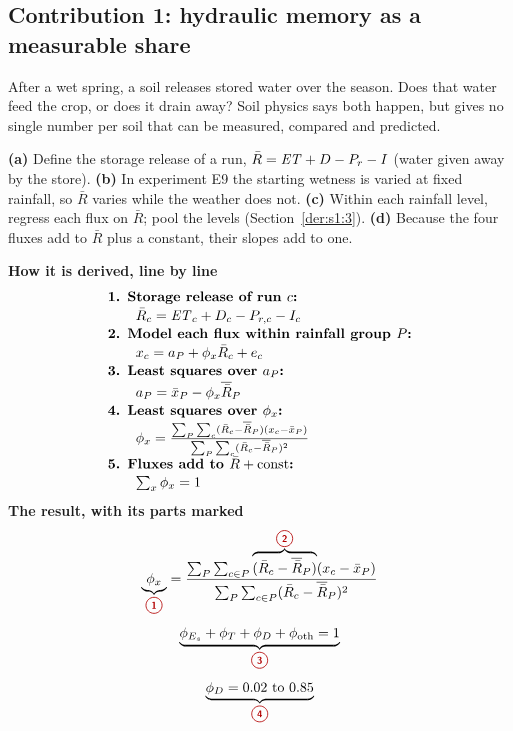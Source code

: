 \subsection{Contribution 1: hydraulic memory as a measurable share}\label{con:s1:1}
\begin{problem}
After a wet spring, a soil releases stored water over the season. Does that water feed the crop, or does it drain away? Soil physics says both happen, but gives no single number per soil that can be measured, compared and predicted.
\end{problem}
\begin{derivation}
\textbf{(a)} Define the storage release of a run, $\bar R=\mathit{ET}+D-P_r-I$ (water given away by the store). \textbf{(b)} In experiment E9 the starting wetness is varied at fixed rainfall, so $\bar R$ varies while the weather does not. \textbf{(c)} Within each rainfall level, regress each flux on $\bar R$; pool the levels (Section~\ref{der:s1:3}). \textbf{(d)} Because the four fluxes add to $\bar R$ plus a constant, their slopes add to one.
\end{derivation}
\begin{keyresult}
\begin{pencil}
{\small\noindent\textbf{How it is derived, line by line}
\[\begin{array}{@{}l@{}}\textbf{1. Storage release of run } c\textbf{:}\\[1pt]
\qquad \bar R_c=\ET_c+D_c-P_{r,c}-I_c\\[1pt]
\textbf{2. Model each flux within rainfall group } P\textbf{:}\\[1pt]
\qquad x_c=a_P+\phi_x\bar R_c+e_c\\[1pt]
\textbf{3. Least squares over } a_P\textbf{:}\\[1pt]
\qquad a_P=\bar x_P-\phi_x\overline{\bar R}_P\\[1pt]
\textbf{4. Least squares over } \phi_x\textbf{:}\\[1pt]
\qquad \phi_x=\frac{\sum_P\sum_c(\bar R_c-\overline{\bar R}_P)(x_c-\bar x_P)}{\sum_P\sum_c(\bar R_c-\overline{\bar R}_P)^2}\\[1pt]
\textbf{5. Fluxes add to } \bar R+\text{const}\textbf{:}\\[1pt]
\qquad \textstyle\sum_x\phi_x=1
\end{array}\]}
\noindent\textbf{The result, with its parts marked}
\[
\underbrace{\phi_x}_{\circled{1}}=\frac{\sum_P\sum_{c\in P}\overbrace{(\bar R_c-\overline{\bar R}_P)}^{\circled{2}}(x_c-\bar x_P)}{\sum_P\sum_{c\in P}(\bar R_c-\overline{\bar R}_P)^2}\]
\[\underbrace{\phi_{E_s}+\phi_T+\phi_D+\phi_{\mathrm{oth}}=1}_{\circled{3}}\]
\[\underbrace{\phi_D=0.02\ \text{to}\ 0.85}_{\circled{4}}
\]
\end{pencil}
\end{keyresult}
